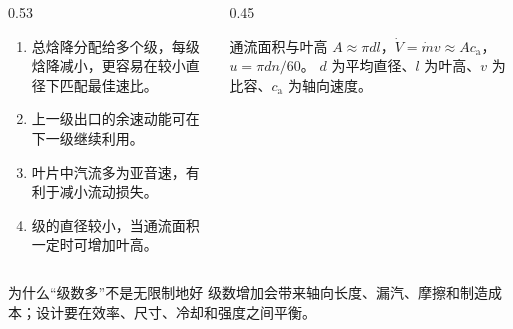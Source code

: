 \begin{frame}[t,shrink]{}
\begin{columns}[T,onlytextwidth]
\begin{column}{0.53\textwidth}
  \begin{enumerate}
    \item 总焓降分配给多个级，每级焓降减小，更容易在较小直径下匹配最佳速比。
    \item 上一级出口的余速动能可在下一级继续利用。
    \item 叶片中汽流多为亚音速，有利于减小流动损失。
    \item 级的直径较小，当通流面积一定时可增加叶高。
  \end{enumerate}
\end{column}
\begin{column}{0.45\textwidth}
  \begin{keybox}{通流面积与叶高}
  \small
  \(A\approx\pi d l\)，\(\dot V=\dot m v\approx A c_{\mathrm{a}}\)，\(u=\pi d n/60\)。
  \(d\) 为平均直径、\(l\) 为叶高、\(v\) 为比容、\(c_{\mathrm{a}}\) 为轴向速度。
  \end{keybox}
\end{column}
\end{columns}
\vspace{0.8mm}
\begin{amberbox}{为什么“级数多”不是无限制地好}
\small 级数增加会带来轴向长度、漏汽、摩擦和制造成本；设计要在效率、尺寸、冷却和强度之间平衡。
\end{amberbox}
\end{frame}

